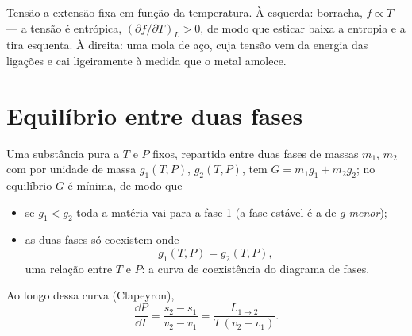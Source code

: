 \begin{omfigure}

{\small Tensão a extensão fixa em função da temperatura. À esquerda: borracha,
$f \propto T$ --- a tensão é entrópica, $(\partial f/\partial T)_L > 0$,
de modo que esticar baixa a entropia e a tira esquenta. À direita: uma mola de
aço, cuja tensão vem da energia das ligações e cai ligeiramente
à medida que o metal amolece.}
\end{omfigure}

\section{Equilíbrio entre duas fases}

\begin{theorem}\label{thm:b2:thermodynamic-potentials:coexistence}
Uma substância pura a $T$ e $P$ fixos, repartida entre duas fases de
massas $m_1$, $m_2$ com  por unidade de massa $g_1(T,P)$,
$g_2(T,P)$, tem $G = m_1g_1 + m_2g_2$; no equilíbrio $G$ é mínima, de modo que
\begin{itemize}
\item se $g_1 < g_2$ toda a matéria vai para a fase 1 (a fase
      estável é a de $g$ \emph{menor});
\item as duas fases só coexistem onde
      \[
      g_1(T,P) = g_2(T,P) ,
      \]
      uma relação entre $T$ e $P$: a curva de coexistência do diagrama
      de fases.
\end{itemize}
Ao longo dessa curva (Clapeyron),
\[
\frac{\dd P}{\dd T} = \frac{s_2 - s_1}{v_2 - v_1} = \frac{L_{1\to2}}{T\,(v_2 - v_1)} .
\]
\end{theorem}

